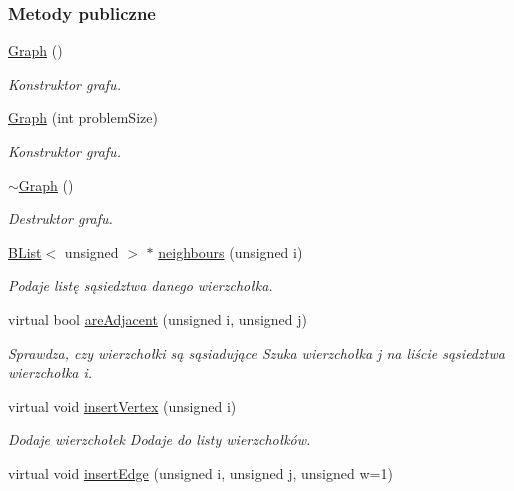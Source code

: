 \subsubsection*{Metody publiczne}
\begin{DoxyCompactItemize}
\item 
\hyperlink{class_graph_ae4c72b8ac4d693c49800a4c7e273654f}{Graph} ()
\begin{DoxyCompactList}\small\item\em Konstruktor grafu. \end{DoxyCompactList}\item 
\hyperlink{class_graph_a4112e28d02c5b96ff903e0c5ef23f754}{Graph} (int problem\-Size)
\begin{DoxyCompactList}\small\item\em Konstruktor grafu. \end{DoxyCompactList}\item 
\hyperlink{class_graph_a902c5b3eacb66d60752525ab23297a95}{$\sim$\-Graph} ()
\begin{DoxyCompactList}\small\item\em Destruktor grafu. \end{DoxyCompactList}\item 
\hyperlink{class_b_list}{B\-List}$<$ unsigned $>$ $\ast$ \hyperlink{class_graph_a7ba4e8932750650f1aa0ffac47ef6d53}{neighbours} (unsigned i)
\begin{DoxyCompactList}\small\item\em Podaje listę sąsiedztwa danego wierzchołka. \end{DoxyCompactList}\item 
virtual bool \hyperlink{class_graph_a6e15151dd48dbc8d88e9c69b9da1ce42}{are\-Adjacent} (unsigned i, unsigned j)
\begin{DoxyCompactList}\small\item\em Sprawdza, czy wierzchołki są sąsiadujące Szuka wierzchołka j na liście sąsiedztwa wierzchołka i. \end{DoxyCompactList}\item 
virtual void \hyperlink{class_graph_a2fbe0e22365c6ca537ad58cc41f762d3}{insert\-Vertex} (unsigned i)
\begin{DoxyCompactList}\small\item\em Dodaje wierzchołek Dodaje do listy wierzchołków. \end{DoxyCompactList}\item 
virtual void \hyperlink{class_graph_adcd035a684543785d45f5e595e642d04}{insert\-Edge} (unsigned i, unsigned j, unsigned w=1)

\end{DoxyCompactItemize}
